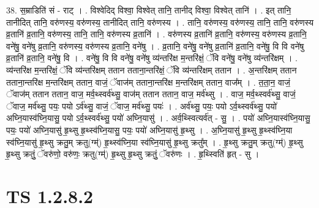 \documentclass[17pt]{extarticle}
\begin{document}
38. स॒म्राडिति॑ सं - राट् । . विश्वेदिद् विश्वा॒ विश्वेत् तानि॒ तानीद् विश्वा॒ विश्वेत् तानि॑ । . इत् तानि॒ तानीदित् तानि॒ वरु॑णस्य॒ वरु॑णस्य॒ तानीदित् तानि॒ वरु॑णस्य । . तानि॒ वरु॑णस्य॒ वरु॑णस्य॒ तानि॒ तानि॒ वरु॑णस्य व्र॒तानि॑ व्र॒तानि॒ वरु॑णस्य॒ तानि॒ तानि॒ वरु॑णस्य व्र॒तानि॑ । . वरु॑णस्य व्र॒तानि॑ व्र॒तानि॒ वरु॑णस्य॒ वरु॑णस्य व्र॒तानि॒ वने॑षु॒ वने॑षु व्र॒तानि॒ वरु॑णस्य॒ वरु॑णस्य व्र॒तानि॒ वने॑षु । . व्र॒तानि॒ वने॑षु॒ वने॑षु व्र॒तानि॑ व्र॒तानि॒ वने॑षु॒ वि वि वने॑षु व्र॒तानि॑ व्र॒तानि॒ वने॑षु॒ वि । . वने॑षु॒ वि वि वने॑षु॒ वने॑षु व्य॑न्तरि॑क्ष म॒न्तरि॑क्षं॒ ॅवि वने॑षु॒ वने॑षु व्य॑न्तरि॑क्षम् । . व्य॑न्तरि॑क्ष म॒न्तरि॑क्षं॒ ॅवि व्य॑न्तरि॑क्षम् ततान तताना॒न्तरि॑क्षं॒ ॅवि व्य॑न्तरि॑क्षम् ततान । . अ॒न्तरि॑क्षम् ततान तताना॒न्तरि॑क्ष म॒न्तरि॑क्षम् ततान॒ वाजं॒ ॅवाज॑म् तताना॒न्तरि॑क्ष म॒न्तरि॑क्षम् ततान॒ वाज᳚म् । . त॒ता॒न॒ वाजं॒ ॅवाज॑म् ततान ततान॒ वाज॒ मर्व॒थ्स्वर्व॑थ्सु॒ वाज॑म् ततान ततान॒ वाज॒ मर्व॑थ्सु । . वाज॒ मर्व॒थ्स्वर्व॑थ्सु॒ वाजं॒ ॅवाज॒ मर्व॑थ्सु॒ पयः॒ पयो ऽर्व॑थ्सु॒ वाजं॒ ॅवाज॒ मर्व॑थ्सु॒ पयः॑ । . अर्व॑थ्सु॒ पयः॒ पयो ऽर्व॒थ्स्वर्व॑थ्सु॒ पयो॑ अघ्नि॒यास्व॑घ्नि॒यासु॒ पयो ऽर्व॒थ्स्वर्व॑थ्सु॒ पयो॑ अघ्नि॒यासु॑ । . अर्व॒थ्स्वित्यर्व॑त् - सु॒ । . पयो॑ अघ्नि॒यास्व॑घ्नि॒यासु॒ पयः॒ पयो॑ अघ्नि॒यासु॑ हृ॒थ्सु हृ॒थ्स्व॑घ्नि॒यासु॒ पयः॒ पयो॑ अघ्नि॒यासु॑ हृ॒थ्सु । . अ॒घ्नि॒यासु॑ हृ॒थ्सु हृ॒थ्स्व॑घ्नि॒या स्व॑घ्नि॒यासु॑ हृ॒थ्सु क्रतु॒म् क्रतु(ग्म्॑) हृ॒थ्स्व॑घ्नि॒या स्व॑घ्नि॒यासु॑ हृ॒थ्सु क्रतु᳚म् । . हृ॒थ्सु क्रतु॒म् क्रतु(ग्म्॑) हृ॒थ्सु हृ॒थ्सु क्रतुं॒ ॅवरु॑णो॒ वरु॑णः॒ क्रतु(ग्म्॑) हृ॒थ्सु हृ॒थ्सु क्रतुं॒ ॅवरु॑णः । . हृ॒थ्स्विति॑ हृत् - सु । \newline
\pagebreak
{}
\section*{ TS 1.2.8.2 }
\end{document}
